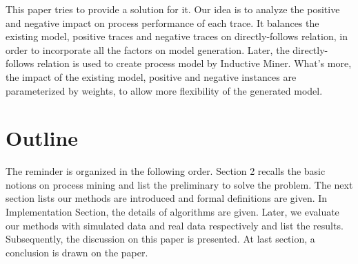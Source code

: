 
This paper tries to provide a solution for it. Our idea is to analyze the positive and negative impact on process performance of each trace. It balances the existing model, positive traces and negative traces on directly-follows relation, in order to incorporate all the factors on model generation. Later, the directly-follows relation is used to create process model by Inductive Miner. What's more, the impact of the existing model, positive and negative instances are parameterized by weights, to allow more flexibility of the generated model.

\section{Outline}
The reminder is organized in the following order. Section 2 recalls the basic notions on process mining and list the preliminary to solve the problem. The next section lists our methods are introduced and formal definitions are given. In Implementation Section, the details of algorithms are given. Later, we evaluate our methods with simulated data and real data respectively and list the results. Subsequently, the discussion on this paper is presented. At last section, a conclusion is drawn on the paper. 


%